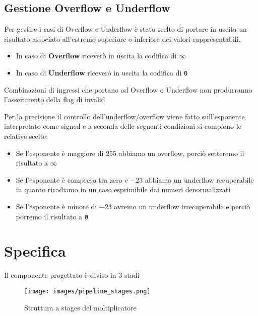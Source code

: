 \documentclass[twoside,11pt]{article}
\begin{document}
\subsection{Gestione Overflow e Underflow}
Per gestire i casi di Overflow e Underflow è stato scelto di portare in uscita un risultato associato all'estremo superiore o inferiore dei valori rappresentabili.
\begin{itemize}[noitemsep]
    \item In caso di \textbf{Overflow} riceverò in uscita la codifica di $\infty$
    \item In caso di \textbf{Underflow} riceverò in uscita la codifica di \verb|0|
\end{itemize}

Combinazioni di ingressi che portano ad Overflow o Underflow non produrranno l’asserimento della flag di invalid

Per la precisione il controllo dell'underflow/overflow viene fatto sull'esponente interpretato come signed e a seconda delle seguenti condizioni si compiono le relative scelte:
\begin{itemize}[noitemsep]
    \item Se l’esponente è maggiore di $255$ abbiamo un overflow, perciò setteremo il risultato a $\infty$
    \item Se l’esponente è compreso tra zero e $-23$ abbiamo un underflow recuperabile in quanto ricadiamo in un caso esprimibile dai numeri denormalizzati
    \item Se l’esponente è minore di $-23$ avremo un underflow irrecuperabile e perciò porremo il risultato a \verb|0|
\end{itemize}

\newpage

\section{Specifica}
Il componente progettato è diviso in 3 stadi

\begin{figure}[h!]
    \centering
    \texttt{[image: images/pipeline\_stages.png]}
    \caption{Struttura a stages del moltiplicatore}
    \label{fig:stages}
\end{figure}
\end{document}
